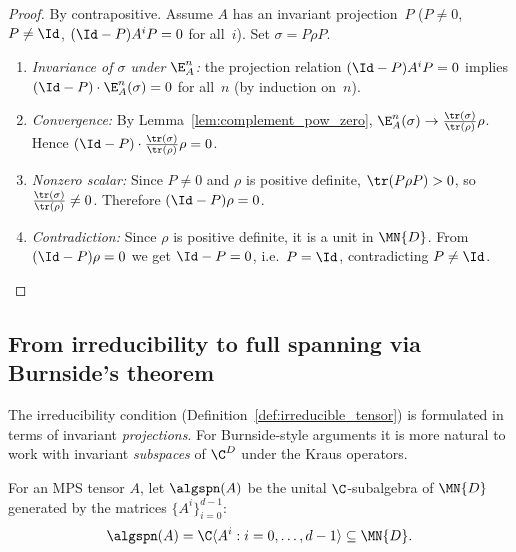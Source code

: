 \begin{proof}
    \leanok
    By contrapositive.
    Assume $A$ has an invariant projection~$P$
    ($P \neq 0$, $P \neq \Id$, $(\Id - P) A^i P = 0$ for all~$i$).
    Set $\sigma = P \rho P$.
    \begin{enumerate}
        \item \emph{Invariance of $\sigma$ under $\E_A^n$:}
              the projection relation
              $(\Id - P) A^i P = 0$ implies
              $(\Id - P) \cdot \E_A^n(\sigma) = 0$ for all~$n$
              (by induction on~$n$).
        \item \emph{Convergence:}
              By Lemma~\ref{lem:complement_pow_zero},
              $\E_A^n(\sigma) \to \frac{\tr(\sigma)}{\tr(\rho)} \rho$.
              Hence
              $(\Id - P) \cdot \frac{\tr(\sigma)}{\tr(\rho)} \rho = 0$.
        \item \emph{Nonzero scalar:}
              Since $P \neq 0$ and $\rho$ is positive definite,
              $\tr(P \rho P) > 0$, so
              $\frac{\tr(\sigma)}{\tr(\rho)} \neq 0$.
              Therefore $(\Id - P) \rho = 0$.
        \item \emph{Contradiction:}
              Since $\rho$ is positive definite, it is a unit
              in $\MN{D}$.
              From $(\Id - P) \rho = 0$ we get $\Id - P = 0$,
              i.e.\ $P = \Id$, contradicting $P \neq \Id$.
    \end{enumerate}
\end{proof}

\subsection{From irreducibility to full spanning via Burnside's theorem}
\label{subsec:burnside_full_span}

The irreducibility condition (Definition~\ref{def:irreducible_tensor}) is formulated
in terms of invariant \emph{projections}.
For Burnside-style arguments it is more natural to work with invariant
\emph{subspaces} of $\C^D$ under the Kraus operators.

\begin{definition}\label{def:alg_span}
    \leanok
    For an MPS tensor $A$, let $\algspn(A)$ be the unital
    $\C$-subalgebra of $\MN{D}$ generated by the matrices $\{A^i\}_{i=0}^{d-1}$:
    \[
        \algspn(A)
        = \C\langle A^i : i = 0, \ldots, d-1\rangle
        \subseteq \MN{D}.
    \]
\end{definition}

